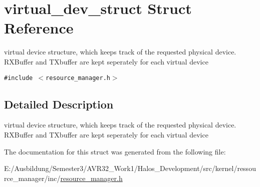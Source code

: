 \hypertarget{structvirtual__dev__struct}{
\section{virtual\_\-dev\_\-struct Struct Reference}
\label{structvirtual__dev__struct}
}
virtual device structure, which keeps track of the requested physical device. RXBuffer and TXbuffer are kept seperately for each virtual device  


{\tt \#include $<$resource\_\-manager.h$>$}



\subsection{Detailed Description}
virtual device structure, which keeps track of the requested physical device. RXBuffer and TXbuffer are kept seperately for each virtual device 

The documentation for this struct was generated from the following file:\begin{CompactItemize}
\item 
E:/Ausbildung/Semester3/AVR32\_\-Work1/Halos\_\-Development/src/kernel/ressource\_\-manager/inc/\hyperlink{resource__manager_8h}{resource\_\-manager.h}\end{CompactItemize}
